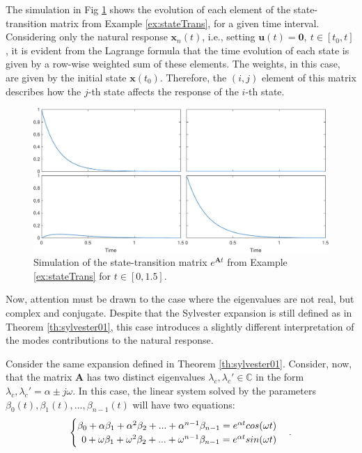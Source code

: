 \documentclass[a4paper,11pt]{book}
\numberwithin{figure}{chapter}
\numberwithin{equation}{chapter}
\numberwithin{table}{chapter}
\newtheorem{theorem}{Theorem}[chapter]
\theoremstyle{definition}
\newcounter{boxed-theorem}
\newenvironment{boxed-theorem}[1]
{\colorlet{shadecolor}{pastelBlue2!5} \begin{shaded} \begin{theorem}{#1}}
{\end{theorem} \end{shaded}}
\newcounter{boxed-lemma}
\newcounter{boxed-definition}
\newcounter{boxed-example}
\begin{document}
The simulation in Fig \ref{fig:stateTrans01} shows the evolution of each element of the state-transition matrix from Example \ref{ex:stateTrans}, for a given time interval. Considering only the natural response $\bm{x}_n(t)$, i.e., setting $\bm{u}(t) = \bm{0},\ t \in [t_0, t]$, it is evident from the Lagrange formula that the time evolution of each state is given by a row-wise weighted sum of these elements. The weights, in this case, are given by the initial state $\bm{x}(t_0)$. Therefore, the $(i, j)$ element of this matrix describes how the $j$-th state affects the response of the $i$-th state.

\begin{figure}[ht] \centering
    \includegraphics[width=\textwidth]{chapter2/stateTrans01}
    
    \caption{Simulation of the state-transition matrix $e^{\bm{A} t}$ from Example \ref{ex:stateTrans} for $t \in [0, 1.5]$.}
    \label{fig:stateTrans01}
\end{figure}

Now, attention must be drawn to the case where the eigenvalues are not real, but complex and conjugate. Despite that the Sylvester expansion is still defined as in Theorem \ref{th:sylvester01}, this case introduces a slightly different interpretation of the modes contributions to the natural response.

\begin{boxed-theorem}{} \label{th:sylvester02}
    Consider the same expansion defined in Theorem \ref{th:sylvester01}. Consider, now, that the matrix $\bm{A}$ has two distinct eigenvalues $\lambda_c, \lambda_c' \in \mathbb{C}$ in the form $\lambda_c, \lambda_c' = \alpha \pm j \omega$. In this case, the linear system solved by the parameters $\beta_0(t), \beta_1(t), ..., \beta_{n-1}(t)$ will have two equations:
    \begin{align} \label{eq:sylvEq01}
    \begin{cases}
        \beta_0 + \alpha \beta_1 + \alpha^{2} \beta_2 + ... + \alpha^{n-1} \beta_{n-1} = e^{\alpha t} cos(\omega t) & \\
        \hfill 0 + \omega \beta_1 + \omega^{2} \beta_2 + ... + \omega^{n-1} \beta_{n-1} = e^{\alpha t} sin(\omega t) &
    \end{cases}
    .\end{align}
\end{boxed-theorem}
\end{document}
